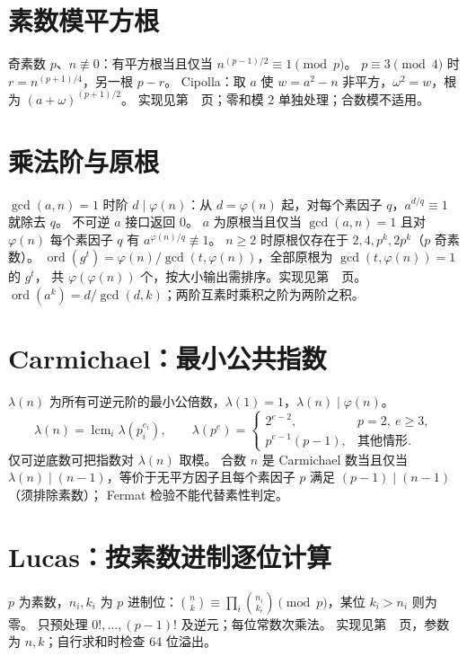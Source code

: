 \section{素数模平方根}\label{knowledge-quadratic-residue}
奇素数 $p$、$n\not\equiv0$：有平方根当且仅当 $n^{(p-1)/2}\equiv1\pmod p$。
$p\equiv3\pmod4$ 时 $r=n^{(p+1)/4}$，另一根 $p-r$。
Cipolla：取 $a$ 使 $w=a^2-n$ 非平方，$\omega^2=w$，根为 $(a+\omega)^{(p+1)/2}$。
实现见第~\pageref{compact-mod_sqrt}~页；零和模 2 单独处理；合数模不适用。

\section{乘法阶与原根}\label{knowledge-primitive-root}
$\gcd(a,n)=1$ 时阶 $d\mid\varphi(n)$：从 $d=\varphi(n)$ 起，对每个素因子 $q$，$a^{d/q}\equiv1$ 就除去 $q$。
不可逆 $a$ 接口返回 0。
$a$ 为原根当且仅当 $\gcd(a,n)=1$ 且对 $\varphi(n)$ 每个素因子 $q$ 有 $a^{\varphi(n)/q}\not\equiv1$。
$n\ge2$ 时原根仅存在于 $2,4,p^k,2p^k$（$p$ 奇素数）。
$\operatorname{ord}(g^t)=\varphi(n)/\gcd(t,\varphi(n))$，全部原根为 $\gcd(t,\varphi(n))=1$ 的 $g^t$，
共 $\varphi(\varphi(n))$ 个，按大小输出需排序。实现见第~\pageref{compact-PrimitiveRoot}~页。
$\operatorname{ord}(a^k)=d/\gcd(d,k)$；两阶互素时乘积之阶为两阶之积。

\section{Carmichael：最小公共指数}\label{knowledge-carmichael}
$\lambda(n)$ 为所有可逆元阶的最小公倍数，$\lambda(1)=1$，$\lambda(n)\mid\varphi(n)$。
\[
\lambda(n)=\operatorname{lcm}_i\lambda(p_i^{e_i}),\qquad
\lambda(p^e)=
\begin{cases}
2^{e-2},&p=2,\ e\ge3,\\
p^{e-1}(p-1),&\text{其他情形}.
\end{cases}
\]
仅可逆底数可把指数对 $\lambda(n)$ 取模。
合数 $n$ 是 Carmichael 数当且仅当 $\lambda(n)\mid(n-1)$，等价于无平方因子且每个素因子 $p$ 满足 $(p-1)\mid(n-1)$（须排除素数）；
Fermat 检验不能代替素性判定。

\section{Lucas：按素数进制逐位计算}\label{knowledge-lucas}
$p$ 为素数，$n_i,k_i$ 为 $p$ 进制位：$\binom nk\equiv\prod_i\binom{n_i}{k_i}\pmod p$，某位 $k_i>n_i$ 则为零。
只预处理 $0!,\ldots,(p-1)!$ 及逆元；每位常数次乘法。
实现见第~\pageref{compact-Lucas}~页，参数为 $n,k$；自行求和时检查 64 位溢出。

